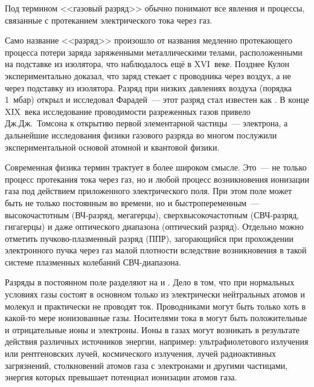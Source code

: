 

Под термином <<газовый разряд>> обычно понимают все явления и процессы,
связанные с протеканием электрического тока через газ.

Само название <<разряд>> произошло от названия медленно протекающего
процесса потери заряда заряженными металлическими телами,
расположенными на подставке из изолятора, что наблюдалось ещё в
XVI~веке. Позднее Кулон экспериментально доказал, что заряд стекает
с проводника через воздух, а не через подставку из изолятора.
Разряд при низких давлениях воздуха (порядка 1~мбар) открыл и исследовал
Фарадей~--- этот разряд стал известен как . В конце XIX~века
исследование проводимости разреженных газов привело Дж.Дж.~Томсона к
открытию первой элементарной частицы~--- электрона, а дальнейшие исследования
физики газового разряда во многом послужили экспериментальной основой
атомной и квантовой физики.


Современная физика термин  трактует в более широком
смысле. Это~--- не только процесс протекания тока через газ, но и любой процесс
возникновения ионизации газа под действием приложенного электрического поля.
При этом поле может быть не только постоянным во времени,
но и быстропеременным~--- высокочастотным (ВЧ-разряд, мегагерцы),
сверхвысокочастотным (СВЧ-разряд, гигагерцы) и даже оптического диапазона
(оптический разряд). Отдельно можно отметить пучково-плазменный разряд (ППР),
загорающийся при прохождении электронного пучка через газ малой плотности
вследствие возникновения в такой системе плазменных колебаний СВЧ-диапазона.

Разряды в постоянном поле разделяют на  и
. Дело в том, что при нормальных
условиях газы состоят в основном только из электрически нейтральных атомов и
молекул и практически не проводят ток.
Проводниками могут быть только хоть в какой-то мере ионизованные газы.
Носителями тока в могут быть положительные и отрицательные ионы и электроны.
Ионы в газах могут возникать в результате действия различных
источников энергии, например: ультрафиолетового излучения или рентгеновских лучей,
космического излучения, лучей радиоактивных загрязнений,
столкновений атомов газа с электронами и другими частицами, энергия
которых превышает потенциал ионизации атомов газа.

